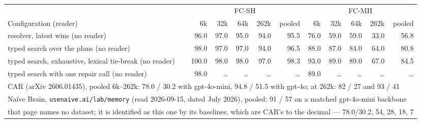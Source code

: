 \begin{tabular}{lrrrrrrrrrr}
\toprule
 & \multicolumn{5}{c}{FC-SH} & \multicolumn{5}{c}{FC-MH} \\
\cmidrule(lr){2-6}\cmidrule(lr){7-11}
Configuration (reader) & 6k & 32k & 64k & 262k & pooled & 6k & 32k & 64k & 262k & pooled \\
\midrule
resolver, latest wins (no reader) & 96.0 & 97.0 & 95.0 & 94.0 & 95.5 & 76.0 & 59.0 & 59.0 & 33.0 & 56.8 \\
typed search over the plans (no reader) & 98.0 & 97.0 & 97.0 & 94.0 & 96.5 & 88.0 & 87.0 & 84.0 & 64.0 & 80.8 \\
typed search, exhaustive, lexical tie-break (no reader) & 100.0 & 98.0 & 98.0 & 97.0 & 98.3 & 93.0 & 89.0 & 89.0 & 67.0 & 84.5 \\
typed search with one repair call (no reader) & 98.0 & \ldots & \ldots & \ldots & \ldots & 89.0 & \ldots & \ldots & \ldots & \ldots \\
\midrule
\multicolumn{11}{l}{CAR (arXiv 2606.01435), pooled 6k--262k: 78.0 / 30.2 with gpt-4o-mini, 94.8 / 51.5 with gpt-4o; at 262k: 82 / 27 and 93 / 41} \\
\multicolumn{11}{l}{Na\"ive Brain, \texttt{usenaive.ai/lab/memory} (read 2026-09-15, dated July 2026), pooled: 91 / 57 on a matched gpt-4o-mini backbone} \\
\multicolumn{11}{l}{\quad that page names no dataset; it is identified as this one by its baselines, which are CAR's to the decimal --- 78.0/30.2, 54, 28, 18, 7} \\
\bottomrule
\end{tabular}
